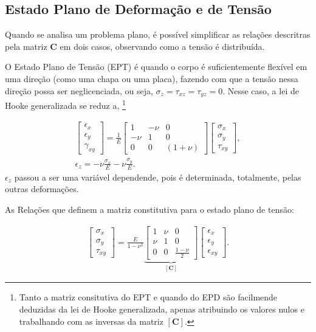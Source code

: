 \subsection{Estado Plano de Deformação e de Tensão}

Quando se analisa um problema plano, é possível simplificar as relações descritras pela matriz $\bm{C}$ em dois casos, observando como a tensão é distribuída.

O Estado Plano de Tensão (EPT) é quando o corpo é suficientemente flexível em uma direção (como uma chapa ou uma placa), fazendo com que a tensão nessa direção possa ser neglicenciada, ou seja, $\sigma_z = \tau_{xz} = \tau_{yz} = 0$. Nesse caso, a lei de Hooke generalizada se reduz a, \footnote{Tanto a matriz consitutiva do EPT e quando do EPD são facilmende deduzidas da lei de Hooke generalizada, apenas atribuindo os valores nulos e trabalhando com as inversas da matriz $[\bm{C}]$.}

\begin{gather}
    \begin{bmatrix}
        \epsilon_x \\
        \epsilon_y \\
        \gamma_{xy}
    \end{bmatrix} = \frac{1}{E} \begin{bmatrix}
        1 & -\nu & 0 \\
        -\nu & 1 & 0 \\
        0 & 0 & (1+\nu)
    \end{bmatrix}
    \begin{bmatrix}
        \sigma_x \\
        \sigma_y \\
        \tau_{xy}
    \end{bmatrix}, \\
    \epsilon_z = -\nu \frac{\sigma_x}{E} - \nu \frac{\sigma_y}{E}.
\end{gather}
$\epsilon_z$ passou a ser uma variável dependende, pois é determinada, totalmente, pelas outras deformações. \cite[pág. 90]{Zin}

As Relações que definem a matriz constitutiva para o estado plano de tensão:

\begin{gather}
    \begin{bmatrix}
        \sigma_x \\
        \sigma_y \\
        \tau_{xy}
    \end{bmatrix} = \frac{E}{1-\nu^2} 
    \underbrace{\begin{bmatrix}
        1 & \nu & 0 \\
        \nu & 1 & 0 \\
        0 & 0 & \frac{1-\nu}{2}
    \end{bmatrix}}_{[\bm{C}]}
    \begin{bmatrix}
        \epsilon_x \\
        \epsilon_y \\
        \epsilon_{xy}
    \end{bmatrix}.
\end{gather}

